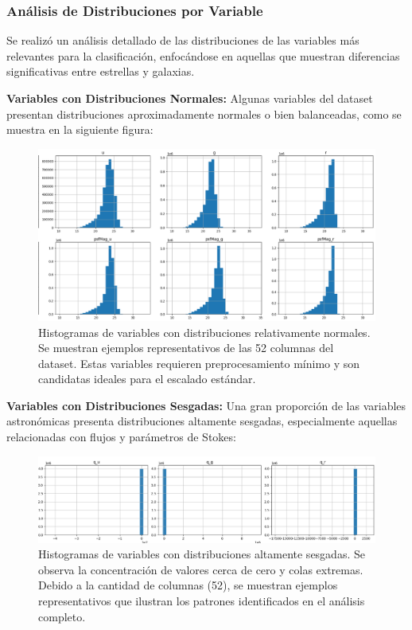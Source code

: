 \documentclass{article}
\begin{document}
\subsubsection{Análisis de Distribuciones por Variable}

Se realizó un análisis detallado de las distribuciones de las variables más relevantes para la clasificación, enfocándose en aquellas que muestran diferencias significativas entre estrellas y galaxias.

\textbf{Variables con Distribuciones Normales:}
Algunas variables del dataset presentan distribuciones aproximadamente normales o bien balanceadas, como se muestra en la siguiente figura:

\begin{figure}[H]
    \centering
    \includegraphics[width=1.0\linewidth]{variables_normales.png}
    \caption{Histogramas de variables con distribuciones relativamente normales. Se muestran ejemplos representativos de las 52 columnas del dataset. Estas variables requieren preprocesamiento mínimo y son candidatas ideales para el escalado estándar.}
    \label{fig:variables_normales}
\end{figure}

\textbf{Variables con Distribuciones Sesgadas:}
Una gran proporción de las variables astronómicas presenta distribuciones altamente sesgadas, especialmente aquellas relacionadas con flujos y parámetros de Stokes:

\begin{figure}[H]
    \centering
    \includegraphics[width=1.0\linewidth]{variables_sesgadas.png}
    \caption{Histogramas de variables con distribuciones altamente sesgadas. Se observa la concentración de valores cerca de cero y colas extremas. Debido a la cantidad de columnas (52), se muestran ejemplos representativos que ilustran los patrones identificados en el análisis completo.}
    \label{fig:variables_sesgadas}
\end{figure}
\end{document}
